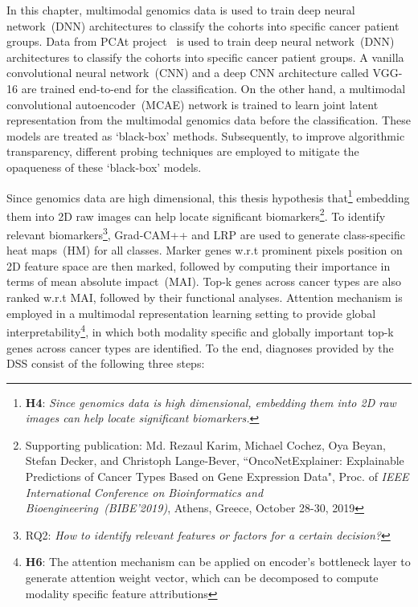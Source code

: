 \hspace*{3.5mm} In this chapter, multimodal genomics data is used to train deep neural network~(DNN) architectures to classify the cohorts into specific cancer patient groups. Data from PCAt project~\cite{weinstein2013cancer} is used to train deep neural network~(DNN) architectures to classify the cohorts into specific cancer patient groups. A vanilla convolutional neural network~(CNN) and a deep CNN architecture called VGG-16 are trained end-to-end for the classification. On the other hand, a multimodal convolutional autoencoder~(MCAE) network is trained to learn joint latent representation from the multimodal genomics data before the classification. These models are treated as `black-box' methods. Subsequently, to improve algorithmic transparency, different probing techniques are employed to mitigate the opaqueness of these `black-box' models. 

\hspace*{3.5mm} Since genomics data are high dimensional, this thesis hypothesis that\footnote{\textbf{H4}: \textit{Since genomics data is high dimensional, embedding them into 2D raw images can help locate significant biomarkers.}} embedding them into 2D raw images can help locate significant biomarkers\footnote{Supporting publication: Md. Rezaul Karim, Michael Cochez, Oya Beyan, Stefan Decker, and Christoph Lange-Bever, ``OncoNetExplainer: Explainable Predictions of Cancer Types Based on Gene Expression Data", Proc. of \emph{IEEE International Conference on Bioinformatics and Bioengineering~(BIBE'2019)}, Athens, Greece, October 28-30, 2019}. %
To identify relevant biomarkers\footnote{RQ2: \textit{How to identify relevant features or factors for a certain decision?}}, Grad-CAM++ and LRP are used to generate class-specific heat maps~(HM) for all classes. 
Marker genes w.r.t prominent pixels position on 2D feature space are then marked, followed by computing their importance in terms of mean absolute impact~(MAI). Top-k genes across cancer types are also ranked w.r.t MAI, followed by their functional analyses.  
Attention mechanism is employed in a multimodal representation learning setting to provide global interpretability\footnote{\textbf{H6}: The attention mechanism can be applied on encoder's bottleneck layer to generate attention weight vector, which can be decomposed to compute modality specific feature attributions}, in which both modality specific and globally important top-k genes across cancer types are identified. To the end, diagnoses provided by the DSS consist of the following three steps: 

